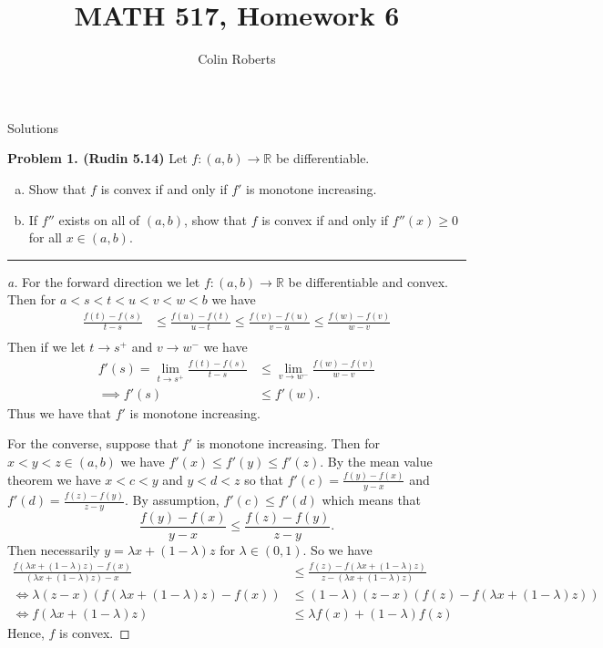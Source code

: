 \documentclass[leqno]{article}
\author{Colin Roberts}
\title{MATH 517, Homework 6}
\theoremstyle{nonumberplain}
\newtheorem{proof}{Proof}
\newcommand{\R}{\mathbb{R}}
\begin{document}
\maketitle
\begin{large}
\begin{center}
Solutions
\end{center}
\end{large}
\pagebreak


\noindent\textbf{Problem 1. (Rudin 5.14)} Let $f\colon (a,b)\to \mathbb{R}$ be differentiable.
\begin{enumerate}[(a)]
\item Show that $f$ is convex if and only if $f'$ is monotone increasing.
\item If $f''$ exists on all of $(a,b)$, show that $f$ is convex if and only if $f''(x)\geq 0$ for all $x\in (a,b)$.
\end{enumerate} 
 

\noindent\rule[0.5ex]{\linewidth}{1pt}

\begin{proof}[a]
For the forward direction we let $f\colon (a,b) \to \R$ be differentiable and convex.  Then for $a<s<t<u<v<w<b$ we have
\begin{align*}
\frac{f(t)-f(s)}{t-s}&\leq \frac{f(u)-f(t)}{u-t} \leq \frac{f(v)-f(u)}{v-u}\leq \frac{f(w)-f(v)}{w-v}\\
\end{align*}
Then if we let $t \to s^+$ and $v\to w^-$ we have
\begin{align*}
f'(s)=\lim_{t \to s^+} \frac{f(t)-f(s)}{t-s} & \leq \lim_{v\to w^-} \frac{f(w)-f(v)}{w-v}\\
\implies f'(s)&\leq f'(w).
\end{align*}
Thus we have that $f'$ is monotone increasing.

\noindent For the converse, suppose that $f'$ is monotone increasing.  Then for $x<y<z \in (a,b)$ we have $f'(x)\leq f'(y) \leq f'(z)$. By the mean value theorem we have $x< c<y$ and $y<d<z$ so that $f'(c)=\frac{f(y)-f(x)}{y-x}$ and $f'(d)=\frac{f(z)-f(y)}{z-y}$.  By assumption, $f'(c)\leq f'(d)$ which means that
\[
\frac{f(y)-f(x)}{y-x}\leq \frac{f(z)-f(y)}{z-y}.
\]
Then necessarily $y=\lambda x +(1-\lambda)z$ for $\lambda \in (0,1)$. So we have
\begin{align*}
\frac{f(\lambda x + (1-\lambda)z)-f(x)}{(\lambda x + (1-\lambda)z)-x} &\leq \frac{f(z)-f(\lambda x + (1-\lambda)z)}{z-(\lambda x + (1-\lambda)z)}
\\
\iff \lambda(z-x)(f(\lambda x + (1-\lambda)z)-f(x)) &\leq (1-\lambda)(z-x) (f(z)-f(\lambda x + (1-\lambda)z))\\
\iff f(\lambda x + (1-\lambda)z) &\leq \lambda f(x) + (1-\lambda)f(z)
\end{align*}
Hence, $f$ is convex.
\end{proof}
\end{document}
